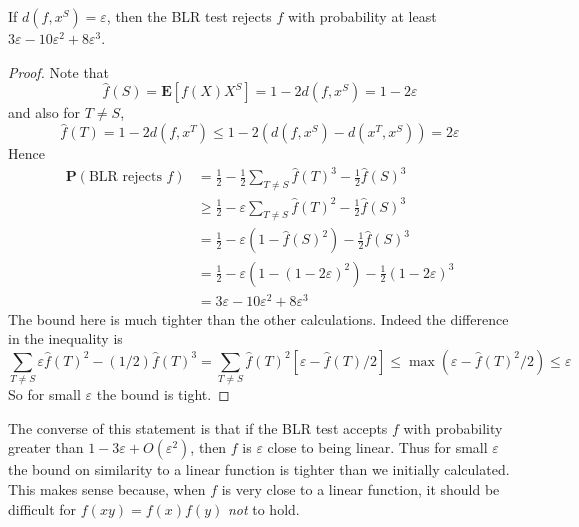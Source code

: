 \begin{theorem}
    If $d(f,x^S) = \varepsilon$, then the BLR test rejects $f$ with probability at least $3\varepsilon - 10 \varepsilon^2 + 8 \varepsilon^3$.
\end{theorem}
\begin{proof}
    Note that
    \[ \widehat{f}(S) = \mathbf{E}[f(X)X^S] = 1 - 2d(f,x^S) = 1 - 2\varepsilon \]
    and also for $T \neq S$,
    \[ \widehat{f}(T) = 1 - 2d(f,x^T) \leq 1 - 2(d(f,x^S) - d(x^T,x^S)) = 2 \varepsilon \]
    Hence
    \begin{align*}
        \mathbf{P}(\text{BLR rejects $f$}) &= \frac{1}{2} - \frac{1}{2} \sum_{T \neq S} \widehat{f}(T)^3  - \frac{1}{2} \widehat{f}(S)^3\\
        &\geq \frac{1}{2}  - \varepsilon \sum_{T \neq S} \widehat{f}(T)^2 - \frac{1}{2} \widehat{f}(S)^3\\
        &= \frac{1}{2} - \varepsilon (1 - \widehat{f}(S)^2) - \frac{1}{2} \widehat{f}(S)^3\\
        &= \frac{1}{2} - \varepsilon (1 - (1 - 2 \varepsilon)^2) - \frac{1}{2} (1 - 2\varepsilon)^3\\
        &=  3\varepsilon - 10 \varepsilon^2 + 8 \varepsilon^3
    \end{align*}
    The bound here is much tighter than the other calculations. Indeed the difference in the inequality is
    \[ \sum_{T \neq S} \varepsilon \widehat{f}(T)^2 - (1/2) \widehat{f}(T)^3 = \sum_{T \neq S} \widehat{f}(T)^2 [\varepsilon - \widehat{f}(T)/2] \leq \max(\varepsilon - \widehat{f}(T)^2/2) \leq \varepsilon \]
    So for small $\varepsilon$ the bound is tight.
\end{proof}

The converse of this statement is that if the BLR test accepts $f$ with probability greater than $1 - 3\varepsilon + O(\varepsilon^2)$, then $f$ is $\varepsilon$ close to being linear. Thus for small $\varepsilon$ the bound on similarity to a linear function is tighter than we initially calculated. This makes sense because, when $f$ is very close to a linear function, it should be difficult for $f(xy) = f(x)f(y)$ {\it not} to hold.

